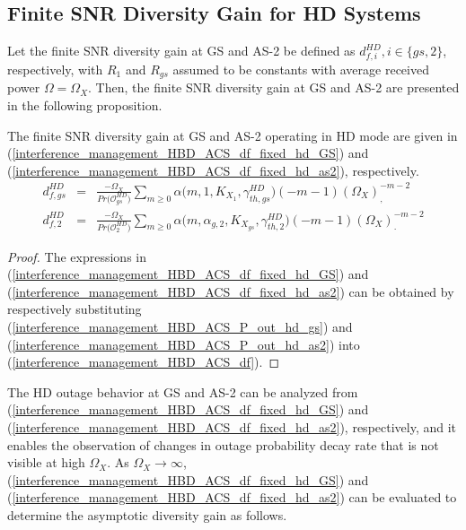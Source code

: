\subsection{Finite SNR Diversity Gain for HD Systems}

Let the finite SNR diversity gain at GS and AS-2 be defined as $d_{f,i}^{HD}, i \in \{gs,2\}$, respectively, with $R_1$ and $R_{gs}$ assumed to be constants with average received power $\Omega = \Omega_X$. Then, the finite SNR diversity gain at GS and AS-2 are presented in the following proposition.

\begin{proposition}
The finite SNR diversity gain at GS and AS-2 operating in HD mode are given in (\ref{interference_management_HBD_ACS_df_fixed_hd_GS}) and (\ref{interference_management_HBD_ACS_df_fixed_hd_as2}), respectively.
\begin{eqnarray} 
d_{f,gs}^{HD} & = & \frac{-\Omega_X}{Pr\big(\mathcal{O}_{gs}^{HD}\big)} \sum_{m\geq0} \alpha\big(m,1,K_{X_1},\gamma_{th,gs}^{HD}\big) (-m-1) (\Omega_{X})^{-m-2}_, \label{interference_management_HBD_ACS_df_fixed_hd_GS}\\
d_{f,2}^{HD} & = & \frac{-\Omega_X}{Pr\big(\mathcal{O}_{2}^{HD}\big)} \sum_{m\geq0} \alpha\big(m,\alpha_{g,2},K_{X_{gs}},\gamma_{th,2}^{HD}\big) (-m-1) (\Omega_{X})^{-m-2}_. \label{interference_management_HBD_ACS_df_fixed_hd_as2}
\end{eqnarray}
\end{proposition}
\begin{proof}
The expressions in (\ref{interference_management_HBD_ACS_df_fixed_hd_GS}) and (\ref{interference_management_HBD_ACS_df_fixed_hd_as2}) can be obtained by respectively substituting (\ref{interference_management_HBD_ACS_P_out_hd_gs}) and (\ref{interference_management_HBD_ACS_P_out_hd_as2}) into (\ref{interference_management_HBD_ACS_df}).
\end{proof}

The HD outage behavior at GS and AS-2 can be analyzed from (\ref{interference_management_HBD_ACS_df_fixed_hd_GS}) and (\ref{interference_management_HBD_ACS_df_fixed_hd_as2}), respectively, and it enables the observation of changes in outage probability decay rate that is not visible at high $\Omega_X$. As $\Omega_X \to \infty$, (\ref{interference_management_HBD_ACS_df_fixed_hd_GS}) and (\ref{interference_management_HBD_ACS_df_fixed_hd_as2}) can be evaluated to determine the asymptotic diversity gain as follows.

